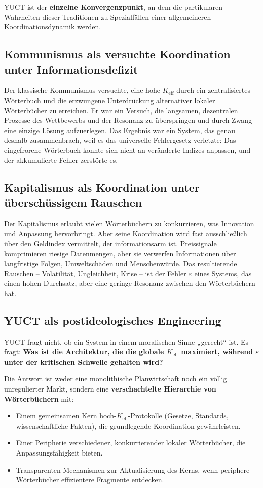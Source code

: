 \documentclass[12pt,a4paper]{article}
\newcommand{\Keff}{K_{\mathrm{eff}}}
\begin{document}
YUCT ist der \textbf{einzelne Konvergenzpunkt}, an dem die partikularen Wahrheiten dieser Traditionen zu Spezialfällen einer allgemeineren Koordinationsdynamik werden.

\subsection{Kommunismus als versuchte Koordination unter Informationsdefizit}

Der klassische Kommunismus versuchte, eine hohe \(\Keff\) durch ein zentralisiertes Wörterbuch und die erzwungene Unterdrückung alternativer lokaler Wörterbücher zu erreichen. Er war ein Versuch, die langsamen, dezentralen Prozesse des Wettbewerbs und der Resonanz zu überspringen und durch Zwang eine einzige Lösung aufzuerlegen. Das Ergebnis war ein System, das genau deshalb zusammenbrach, weil es das universelle Fehlergesetz verletzte: Das eingefrorene Wörterbuch konnte sich nicht an veränderte Indizes anpassen, und der akkumulierte Fehler zerstörte es.

\subsection{Kapitalismus als Koordination unter überschüssigem Rauschen}

Der Kapitalismus erlaubt vielen Wörterbüchern zu konkurrieren, was Innovation und Anpassung hervorbringt. Aber seine Koordination wird fast ausschließlich über den Geldindex vermittelt, der informationsarm ist. Preissignale komprimieren riesige Datenmengen, aber sie verwerfen Informationen über langfristige Folgen, Umweltschäden und Menschenwürde. Das resultierende Rauschen – Volatilität, Ungleichheit, Krise – ist der Fehler \(\varepsilon\) eines Systems, das einen hohen Durchsatz, aber eine geringe Resonanz zwischen den Wörterbüchern hat.

\subsection{YUCT als postideologisches Engineering}

YUCT fragt nicht, ob ein System in einem moralischen Sinne „gerecht“ ist. Es fragt: \textbf{Was ist die Architektur, die die globale \(K_{\mathrm{eff}}\) maximiert, während \(\varepsilon\) unter der kritischen Schwelle gehalten wird?}

Die Antwort ist weder eine monolithische Planwirtschaft noch ein völlig unregulierter Markt, sondern eine \textbf{verschachtelte Hierarchie von Wörterbüchern} mit:
\begin{itemize}[leftmargin=*]
	\item Einem gemeinsamen Kern hoch-\(\Keff\)-Protokolle (Gesetze, Standards, wissenschaftliche Fakten), die grundlegende Koordination gewährleisten.
	\item Einer Peripherie verschiedener, konkurrierender lokaler Wörterbücher, die Anpassungsfähigkeit bieten.
	\item Transparenten Mechanismen zur Aktualisierung des Kerns, wenn periphere Wörterbücher effizientere Fragmente entdecken.
\end{itemize}
\end{document}
